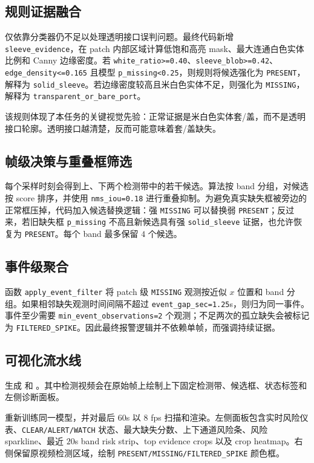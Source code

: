 \documentclass[a4paper,12pt]{article}
\newcommand{\code}[1]{\texttt{#1}}
\begin{document}
\subsection{规则证据融合}
仅依靠分类器仍不足以处理透明接口误判问题。最终代码新增 \code{sleeve\_evidence}，在 patch 内部区域计算低饱和高亮 mask、最大连通白色实体比例和 Canny 边缘密度。若 \code{white\_ratio>=0.40}、\code{sleeve\_blob>=0.42}、\code{edge\_density<=0.165} 且模型 \code{p\_missing<0.25}，则规则将候选强化为 \code{PRESENT}，解释为 \code{solid\_sleeve}。若边缘密度较高且米白色实体不足，则强化为 \code{MISSING}，解释为 \code{transparent\_or\_bare\_port}。

该规则体现了本任务的关键视觉先验：正常证据是米白色实体套/盖，而不是透明接口轮廓。透明接口越清楚，反而可能意味着套/盖缺失。

\subsection{帧级决策与重叠框筛选}
每个采样时刻会得到上、下两个检测带中的若干候选。算法按 band 分组，对候选按 score 排序，并使用 \code{nms\_iou=0.18} 进行重叠抑制。为避免真实缺失框被旁边的正常框压掉，代码加入候选替换逻辑：强 \code{MISSING} 可以替换弱 \code{PRESENT}；反过来，若旧缺失框 \code{p\_missing} 不高且新候选具有强 \code{solid\_sleeve} 证据，也允许恢复为 \code{PRESENT}。每个 band 最多保留 $4$ 个候选。

\subsection{事件级聚合}
函数 \code{apply\_event\_filter} 将 patch 级 \code{MISSING} 观测按近似 $x$ 位置和 band 分组。如果相邻缺失观测时间间隔不超过 \code{event\_gap\_sec=1.25}s，则归为同一事件。事件至少需要 \code{min\_event\_observations=2} 个观测；不足两次的孤立缺失会被标记为 \code{FILTERED\_SPIKE}。因此最终报警逻辑并不依赖单帧，而强调持续证据。

\subsection{可视化流水线}
 生成  和 。其中检测视频会在原始帧上绘制上下固定检测带、候选框、状态标签和左侧诊断面板。

 重新训练同一模型，并对最后 $60$s 以 $8$ fps 扫描和渲染。左侧面板包含实时风险仪表、\code{CLEAR/ALERT/WATCH} 状态、最大缺失分数、上下通道风险条、风险 sparkline、最近 $20$s band risk strip、top evidence crops 以及 crop heatmap。右侧保留原视频检测区域，绘制 \code{PRESENT/MISSING/FILTERED\_SPIKE} 颜色框。
\end{document}
